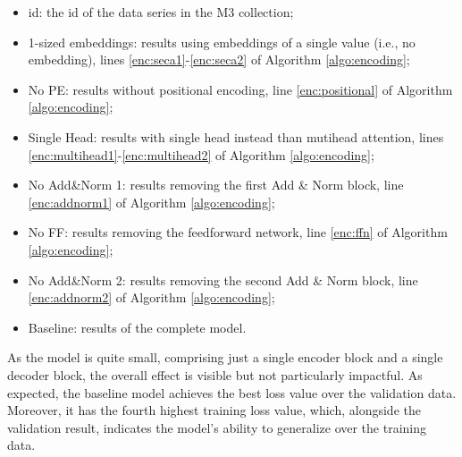 \documentclass[algorithms,article,submit,pdftex,moreauthors]{Definitions/mdpi}
\begin{document}
\begin{itemize}
	\item {id}: the id of the data series in the M3 collection;
	\item {1-sized embeddings}: results using embeddings of a single value (i.e., no embedding), lines \ref{enc:seca1}-\ref{enc:seca2} of Algorithm \ref{algo:encoding};
	\item {No PE}: results without positional encoding, line \ref{enc:positional} of Algorithm \ref{algo:encoding};
	\item {Single Head}: results with single head instead than mutihead attention, lines \ref{enc:multihead1}-\ref{enc:multihead2} of Algorithm \ref{algo:encoding}; 
	\item {No Add\&Norm 1}: results removing the first Add \& Norm block, line \ref{enc:addnorm1} of Algorithm \ref{algo:encoding};
	\item {No FF}: results removing the feedforward network, line \ref{enc:ffn} of Algorithm \ref{algo:encoding};
	\item {No Add\&Norm 2}: results removing the second Add \& Norm block, line \ref{enc:addnorm2} of Algorithm \ref{algo:encoding};
	\item {Baseline}: results of the complete model.
\end{itemize}

As the model is quite small, comprising just a single encoder block and a single decoder block, the overall effect is visible but not particularly impactful. As expected, the baseline model achieves the best loss value over the validation data. Moreover, it has the fourth highest training loss value, which, alongside the validation result, indicates the model's ability to generalize over the training data.
\end{document}
